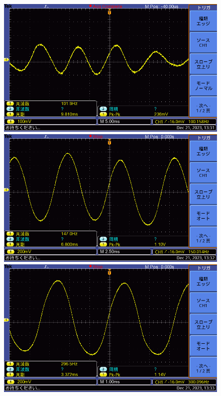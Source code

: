\documentclass{ltjsarticle}
\begin{document}
			\begin{figure}[H]
			\centering
			\begin{minipage}{0.4\columnwidth}
			\centering
			\includegraphics[width = \columnwidth]{figs/F0036TEK.PNG}
			\end{minipage}
			\hspace{0.04\columnwidth}
			\begin{minipage}{0.4\columnwidth}
			\centering
			\includegraphics[width = \columnwidth]{figs/F0037TEK.PNG}
			\end{minipage}
			\hspace{0.04\columnwidth}
			\begin{minipage}{0.4\columnwidth}
			\centering
			\includegraphics[width = \columnwidth]{figs/F0038TEK.PNG}

\end{minipage}
\end{figure}
\end{document}
